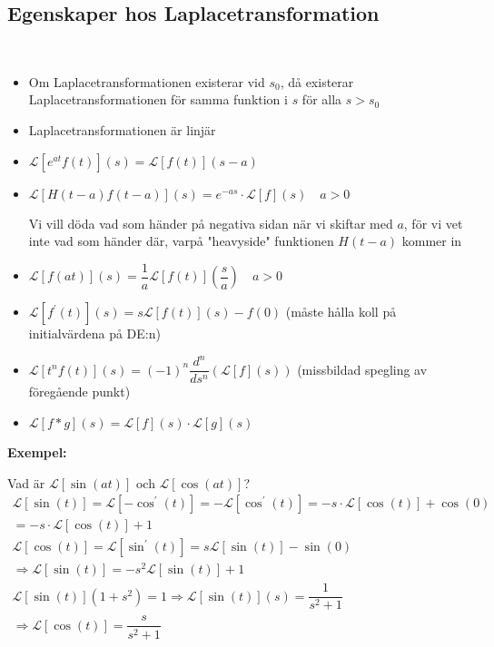 \subsection{Egenskaper hos Laplacetransformation}\hfill\\\par
\begin{itemize}
  \item Om Laplacetransformationen existerar vid $s_0$, då existerar Laplacetransformationen för samma funktion i $s$ för alla $s>s_0$
    \par\bigskip
  \item Laplacetransformationen är linjär
    \par\bigskip
  \item $\mathcal{L}[e^{at}f(t)](s) = \mathcal{L}[f(t)](s-a)$
    \par\bigskip
  \item $\mathcal{L}[H(t-a)f(t-a)](s) = e^{-as}\cdot\mathcal{L}[f](s)\quad a>0$\par
    \noindent Vi vill döda vad som händer på negativa sidan när vi skiftar med $a$, för vi vet inte vad som händer där, varpå "heavyside" funktionen $H(t-a)$ kommer in
    \par\bigskip
  \item $\mathcal{L}[f(at)](s) = \dfrac{1}{a}\mathcal{L}[f(t)]\left(\dfrac{s}{a}\right)\quad a>0$
    \par\bigskip
  \item $\mathcal{L}[f^{\prime}(t)](s) = s\mathcal{L}[f(t)](s)-f(0)$ (måste hålla koll på initialvärdena på DE:n)
    \par\bigskip
  \item $\mathcal{L}[t^nf(t)](s) = (-1)^n\dfrac{d^n}{ds^n}\left(\mathcal{L}[f](s)\right)$ (missbildad spegling av föregående punkt)
    \par\bigskip
  \item $\mathcal{L}[f*g](s) = \mathcal{L}[f](s)\cdot\mathcal{L}[g](s)$
\end{itemize}
\par\bigskip
\noindent\textbf{Exempel:}\par
\noindent Vad är $\mathcal{L}[\sin(at)]$ och $\mathcal{L}[\cos(at)]$?
\begin{equation*}
  \begin{gathered}
    \mathcal{L}[\sin(t)] = \mathcal{L}[-\cos^{\prime}(t)] = -\mathcal{L}[\cos^{\prime}(t)] = -s\cdot\mathcal{L}[\cos(t)]+\cos(0)\\
    = -s\cdot\mathcal{L}[\cos(t)]+1\\
    \mathcal{L}[\cos(t)] = \mathcal{L}[\sin^{\prime}(t)]=s\mathcal{L}[\sin(t)] - \sin(0)\\
    \Rightarrow \mathcal{L}[\sin(t)] = -s^2\mathcal{L}[\sin(t)]+1\\
    \mathcal{L}[\sin(t)](1+s^2) = 1\Rightarrow \mathcal{L}[\sin(t)](s) = \dfrac{1}{s^2+1}\\
    \Rightarrow\mathcal{L}[\cos(t)] = \dfrac{s}{s^2+1}
  \end{gathered}
\end{equation*}
